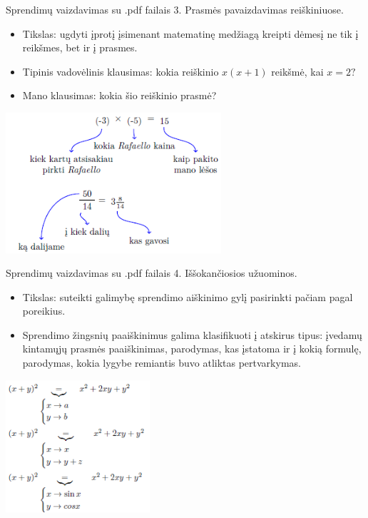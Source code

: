 \documentclass{beamer}
\begin{document}
\begin{frame}[fragile]{Sprendimų vaizdavimas su .pdf failais}
3. Prasmės pavaizdavimas reiškiniuose.
\begin{itemize}
\item Tikslas: ugdyti įprotį įsimenant matematinę medžiagą kreipti dėmesį ne tik į reikšmes, bet ir į prasmes.
\item Tipinis vadovėlinis klausimas: kokia reiškinio $x(x+1)$ reikšmė, kai $x=2?$
\item Mano klausimas: kokia šio reiškinio prasmė?
\end{itemize}
\includegraphics[width = 0.6\textwidth]{prasme.png}
\end{frame}

\begin{frame}[fragile]{Sprendimų vaizdavimas su .pdf failais}
4. Iššokančiosios užuominos.
\begin{itemize}
\item Tikslas: suteikti galimybę sprendimo aiškinimo gylį pasirinkti pačiam pagal poreikius.
\item Sprendimo žingsnių paaiškinimus galima klasifikuoti į atskirus tipus: įvedamų kintamųjų prasmės paaiškinimas, parodymas, kas įstatoma ir į kokią formulę, parodymas, kokia lygybe remiantis buvo atliktas pertvarkymas.
\end{itemize}
\includegraphics[width = 0.4\textwidth]{show.png}
\end{frame}
\end{document}
